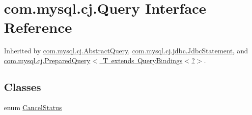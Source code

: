 \hypertarget{interfacecom_1_1mysql_1_1cj_1_1_query}{}\section{com.\+mysql.\+cj.\+Query Interface Reference}
\label{interfacecom_1_1mysql_1_1cj_1_1_query}


Inherited by \mbox{\hyperlink{classcom_1_1mysql_1_1cj_1_1_abstract_query}{com.\+mysql.\+cj.\+Abstract\+Query}}, \mbox{\hyperlink{interfacecom_1_1mysql_1_1cj_1_1jdbc_1_1_jdbc_statement}{com.\+mysql.\+cj.\+jdbc.\+Jdbc\+Statement}}, and \mbox{\hyperlink{interfacecom_1_1mysql_1_1cj_1_1_prepared_query}{com.\+mysql.\+cj.\+Prepared\+Query$<$ T extends Query\+Bindings$<$?$>$}}.

\subsection*{Classes}
\begin{DoxyCompactItemize}
\item 
enum \mbox{\hyperlink{enumcom_1_1mysql_1_1cj_1_1_query_1_1_cancel_status}{Cancel\+Status}}
\end{DoxyCompactItemize}
